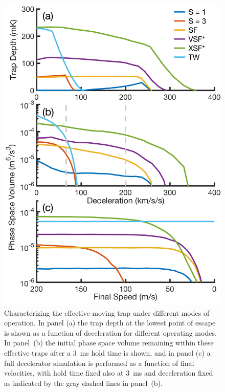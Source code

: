 \documentclass[%
 reprint,
 amsmath,amssymb,
 aps,
prl,
]{revtex4-1}
\begin{document}
\begin{figure}[t]
\includegraphics[width=\linewidth]{full-three-panel.png}%
\caption{
Characterizing the effective moving trap under different modes of operation. In panel (a) the trap depth at the lowest point of escape is shown as a function of deceleration for different operating modes. In panel~(b) the initial phase space volume remaining within these effective traps after a $3$~ms hold time is shown, and in panel (c) a full decelerator simulation is performed as a function of final velocities, with hold time fixed also at $3$~ms and deceleration fixed as indicated by the gray dashed lines in panel~(b).}
\label{fig:efftrap}
\end{figure}
\end{document}
